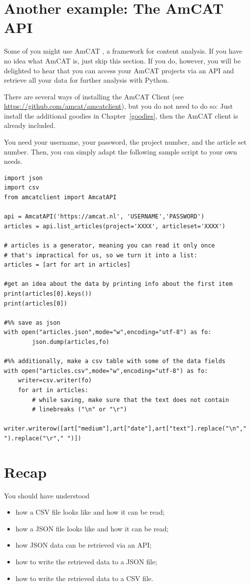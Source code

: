 \documentclass[a4paper,12pt]{book}
\begin{document}
\section{Another example: The AmCAT API}
Some of you might use AmCAT \citep{VanAtteveldt2008}, a framework for content analysis. If you have no idea what AmCAT is, just skip this section. If you do, however, you will be delighted to hear that you can access your AmCAT projects via an API and retrieve all your data for further analysis with Python.

There are several ways of installing the AmCAT Client (see \url{https://github.com/amcat/amcatclient}), but you do not need to do so: Just install the additional goodies in Chapter~\ref{goodies}, then the AmCAT client is already included. 

You need your username, your password, the project number, and the article set number. Then, you can simply adapt the following sample script to your own needs.

\begin{lstlisting}
import json
import csv
from amcatclient import AmcatAPI

api = AmcatAPI('https://amcat.nl', 'USERNAME','PASSWORD')
articles = api.list_articles(project='XXXX', articleset='XXXX')

# articles is a generator, meaning you can read it only once
# that's impractical for us, so we turn it into a list:
articles = [art for art in articles]

#get an idea about the data by printing info about the first item
print(articles[0].keys())
print(articles[0])

#%% save as json
with open("articles.json",mode="w",encoding="utf-8") as fo:
        json.dump(articles,fo)
 
#%% additionally, make a csv table with some of the data fields
with open("articles.csv",mode="w",encoding="utf-8") as fo:
    writer=csv.writer(fo)
    for art in articles:
        # while saving, make sure that the text does not contain 
        # linebreaks ("\n" or "\r")
        writer.writerow([art["medium"],art["date"],art["text"].replace("\n"," ").replace("\r"," ")]) 
\end{lstlisting}




\section{Recap}
You should have understood 
\begin{itemize}
\item how a CSV file looks like and how it can be read;
\item how a JSON file looks like and how it can be read;
\item how JSON data can be retrieved via an API;
\item how to write the retrieved data to a JSON file;
\item how to write the retrieved data to a CSV file.
\end{itemize}
\end{document}

